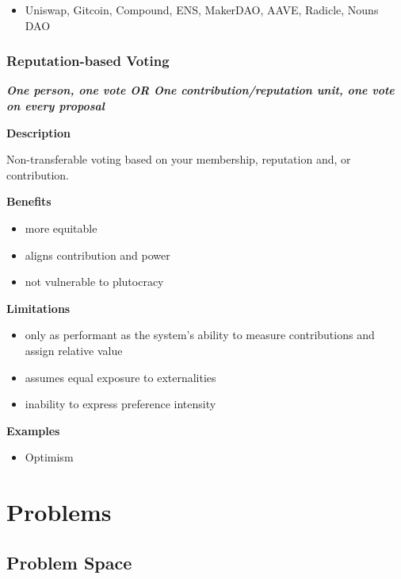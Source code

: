 \documentclass[
]{article}
\providecommand{\tightlist}{%
  \setlength{\itemsep}{0pt}\setlength{\parskip}{0pt}}
\begin{document}
\begin{itemize}
\tightlist
\item
  Uniswap, Gitcoin, Compound, ENS, MakerDAO, AAVE, Radicle, Nouns DAO
\end{itemize}

\hypertarget{reputation-based-voting}{%
\subsubsection{\texorpdfstring{\textbf{Reputation-based
Voting}}{Reputation-based Voting}}\label{reputation-based-voting}}

\textbf{\emph{One person, one vote OR One contribution/reputation unit,
one vote on every proposal}}

\textbf{Description}

Non-transferable voting based on your membership, reputation and, or
contribution.

\textbf{Benefits}

\begin{itemize}
\tightlist
\item
  more equitable
\item
  aligns contribution and power
\item
  not vulnerable to plutocracy
\end{itemize}

\textbf{Limitations}

\begin{itemize}
\tightlist
\item
  only as performant as the system's ability to measure contributions
  and assign relative value
\item
  assumes equal exposure to externalities
\item
  inability to express preference intensity
\end{itemize}

\textbf{Examples}

\begin{itemize}
\tightlist
\item
  Optimism
\end{itemize}
\hypertarget{problems}{%
\section{Problems}\label{problems}}

\hypertarget{problem-space}{%
\subsection{Problem Space}\label{problem-space}}
\end{document}
